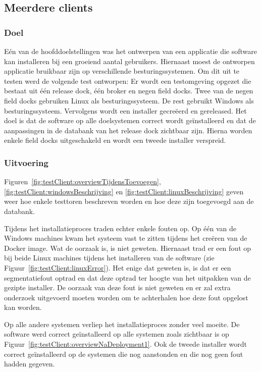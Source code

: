 \subsection{Meerdere clients}
\subsubsection{Doel}
Eén van de hoofddoelstellingen was het ontwerpen van een applicatie die software kan installeren bij een groeiend aantal gebruikers.
Hiernaast moest de ontworpen applicatie bruikbaar zijn op verschillende besturingssystemen.
Om dit uit te testen werd de volgende test ontworpen:
Er wordt een testomgeving opgezet die bestaat uit één release dock, één broker en negen field docks.
Twee van de negen field docks gebruiken Linux als besturingssysteem.
De rest gebruikt Windows als besturingssysteem.
Vervolgens wordt een installer gecreëerd en gereleased.
Het doel is dat de software op alle doelsystemen correct wordt geïnstalleerd en dat de aanpassingen in de databank van het release dock zichtbaar zijn.
Hierna worden enkele field docks uitgeschakeld en wordt een tweede installer verspreid.

\subsubsection{Uitvoering}
Figuren~\ref{fig:testClient:overviewTijdensToevoegen}, \ref{fig:testClient:windowsBeschrijving} en \ref{fig:testClient:linuxBeschrijving} geven weer hoe enkele testtoren beschreven worden en hoe deze zijn toegevoegd aan de databank.

Tijdens het installatieproces traden echter enkele fouten op.
Op één van de Windows machines kwam het systeem vast te zitten tijdens het creëren van de Docker image.
Wat de oorzaak is, is niet geweten.
Hiernaast trad er een fout op bij beide Linux machines tijdens het installeren van de software (zie Figuur~\ref{fig:testClient:linuxError}).
Het enige dat geweten is, is dat er een segmentatiefout optrad en dat deze optrad ter hoogte van het uitpakken van de gezipte installer.
De oorzaak van deze fout is niet geweten en er zal extra onderzoek uitgevoerd moeten worden om te achterhalen hoe deze fout opgelost kan worden.

Op alle andere systemen verliep het installatieproces zonder veel moeite.
De software werd correct geïnstalleerd op alle systemen zoals zichtbaar is op Figuur~\ref{fig:testClient:overviewNaDeployment1}.
Ook de tweede installer wordt correct geïnstalleerd op de systemen die nog aanstonden en die nog geen fout hadden gegeven.

